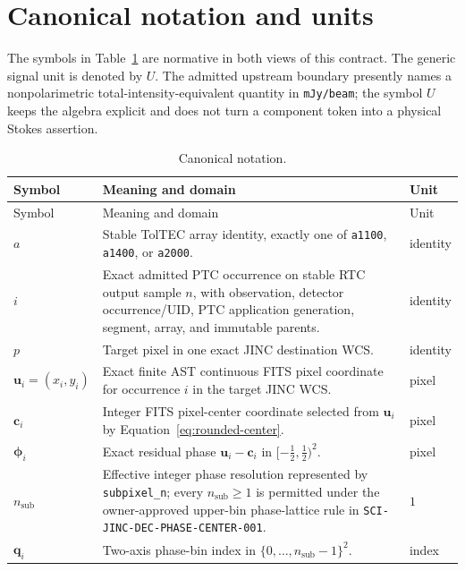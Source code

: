 \section{Canonical notation and units}
\label{sec:notation}

The symbols in Table~\ref{tab:notation} are normative in both views of this
contract.  The generic signal unit is denoted by $U$.  The admitted upstream
boundary presently names a nonpolarimetric total-intensity-equivalent quantity
in \texttt{mJy/beam}; the symbol $U$ keeps the algebra explicit and does not
turn a component token into a physical Stokes assertion.

\begin{longtable}{@{}>{\raggedright\arraybackslash}p{}
                        >{\raggedright\arraybackslash}p{}
                        >{\raggedright\arraybackslash}p{}@{}}
\caption{Canonical notation.}\label{tab:notation}\\
\toprule
Symbol & Meaning and domain & Unit \\
\midrule
\endfirsthead
\toprule
Symbol & Meaning and domain & Unit \\
\midrule
\endhead
$a$ & Stable TolTEC array identity, exactly one of \texttt{a1100},
\texttt{a1400}, or \texttt{a2000}. & identity \\
$i$ & Exact admitted PTC occurrence on stable RTC output sample $n$, with
observation, detector occurrence/UID, PTC application generation, segment,
array, and immutable parents. & identity \\
$p$ & Target pixel in one exact JINC destination WCS. & identity \\
$\boldsymbol{u}_i=(x_i,y_i)$ & Exact finite AST continuous FITS pixel
coordinate for occurrence $i$ in the target JINC WCS. & pixel \\
$\boldsymbol{c}_i$ & Integer FITS pixel-center coordinate selected from
$\boldsymbol{u}_i$ by Equation~\eqref{eq:rounded-center}. & pixel \\
$\boldsymbol{\phi}_i$ & Exact residual phase
$\boldsymbol{u}_i-\boldsymbol{c}_i$ in
$[-\tfrac12,\tfrac12)^2$. & pixel \\
$n_{\mathrm{sub}}$ & Effective integer phase resolution represented by
\texttt{subpixel\_n}; every $n_{\mathrm{sub}}\ge1$ is permitted under the
owner-approved upper-bin phase-lattice rule in
\texttt{SCI-JINC-DEC-PHASE-CENTER-001}. & $1$ \\
$\boldsymbol{q}_i$ & Two-axis phase-bin index in
$\{0,\ldots,n_{\mathrm{sub}}-1\}^2$. & index \\

\end{longtable}
